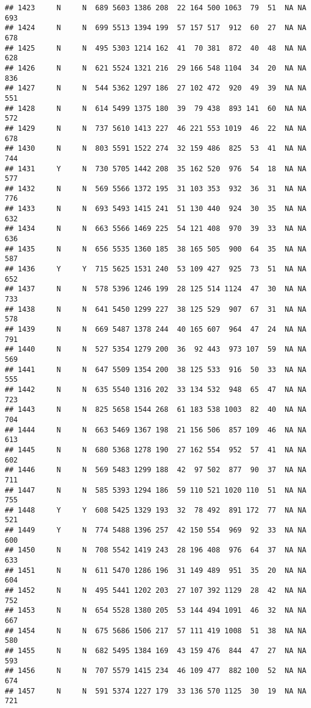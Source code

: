 \documentclass[]{article}
\begin{document}
\begin{verbatim}
## 1423     N     N  689 5603 1386 208  22 164 500 1063  79  51  NA NA  693
## 1424     N     N  699 5513 1394 199  57 157 517  912  60  27  NA NA  678
## 1425     N     N  495 5303 1214 162  41  70 381  872  40  48  NA NA  628
## 1426     N     N  621 5524 1321 216  29 166 548 1104  34  20  NA NA  836
## 1427     N     N  544 5362 1297 186  27 102 472  920  49  39  NA NA  551
## 1428     N     N  614 5499 1375 180  39  79 438  893 141  60  NA NA  572
## 1429     N     N  737 5610 1413 227  46 221 553 1019  46  22  NA NA  678
## 1430     N     N  803 5591 1522 274  32 159 486  825  53  41  NA NA  744
## 1431     Y     N  730 5705 1442 208  35 162 520  976  54  18  NA NA  577
## 1432     N     N  569 5566 1372 195  31 103 353  932  36  31  NA NA  776
## 1433     N     N  693 5493 1415 241  51 130 440  924  30  35  NA NA  632
## 1434     N     N  663 5566 1469 225  54 121 408  970  39  33  NA NA  636
## 1435     N     N  656 5535 1360 185  38 165 505  900  64  35  NA NA  587
## 1436     Y     Y  715 5625 1531 240  53 109 427  925  73  51  NA NA  652
## 1437     N     N  578 5396 1246 199  28 125 514 1124  47  30  NA NA  733
## 1438     N     N  641 5450 1299 227  38 125 529  907  67  31  NA NA  578
## 1439     N     N  669 5487 1378 244  40 165 607  964  47  24  NA NA  791
## 1440     N     N  527 5354 1279 200  36  92 443  973 107  59  NA NA  569
## 1441     N     N  647 5509 1354 200  38 125 533  916  50  33  NA NA  555
## 1442     N     N  635 5540 1316 202  33 134 532  948  65  47  NA NA  723
## 1443     N     N  825 5658 1544 268  61 183 538 1003  82  40  NA NA  704
## 1444     N     N  663 5469 1367 198  21 156 506  857 109  46  NA NA  613
## 1445     N     N  680 5368 1278 190  27 162 554  952  57  41  NA NA  602
## 1446     N     N  569 5483 1299 188  42  97 502  877  90  37  NA NA  711
## 1447     N     N  585 5393 1294 186  59 110 521 1020 110  51  NA NA  755
## 1448     Y     Y  608 5425 1329 193  32  78 492  891 172  77  NA NA  521
## 1449     Y     N  774 5488 1396 257  42 150 554  969  92  33  NA NA  600
## 1450     N     N  708 5542 1419 243  28 196 408  976  64  37  NA NA  633
## 1451     N     N  611 5470 1286 196  31 149 489  951  35  20  NA NA  604
## 1452     N     N  495 5441 1202 203  27 107 392 1129  28  42  NA NA  752
## 1453     N     N  654 5528 1380 205  53 144 494 1091  46  32  NA NA  667
## 1454     N     N  675 5686 1506 217  57 111 419 1008  51  38  NA NA  580
## 1455     N     N  682 5495 1384 169  43 159 476  844  47  27  NA NA  593
## 1456     N     N  707 5579 1415 234  46 109 477  882 100  52  NA NA  674
## 1457     N     N  591 5374 1227 179  33 136 570 1125  30  19  NA NA  721

\end{verbatim}
\end{document}
